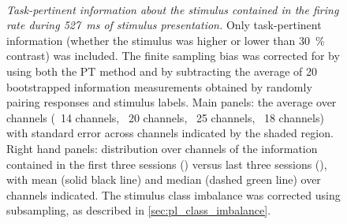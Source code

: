 \begin{figure}[htbp]%
    \centering
    \hspace*{\fill}
    \hspace*{\fill}\hspace{.2cm}\hspace*{\fill}
    \hspace*{\fill}
    \\
    \hspace*{\fill}
    \hspace*{\fill}\hspace{.2cm}\hspace*{\fill}
    \hspace*{\fill}
    \caption{\textit{Task-pertinent information about the stimulus contained in the firing rate during \SI{527}{\milli\second} of stimulus presentation.}
Only task-pertinent information (whether the stimulus was higher or lower than \SI{30}{\percent} contrast) was included.
The finite sampling bias was corrected for by using both the \ac{PT} method and by subtracting the average of \num{20} bootstrapped information measurements obtained by randomly pairing responses and stimulus labels.
Main panels: the average over channels (\protect{}~\num{14} channels, \protect{}~\num{20} channels, \protect{}~\num{25} channels, \protect{}~\num{18} channels) with standard error across channels indicated by the shaded region.
Right hand panels: distribution over channels of the information contained in the first three sessions () versus last three sessions (), with mean (solid black line) and median (dashed green line) over channels indicated.
The stimulus class imbalance was corrected using subsampling, as described in \autoref{sec:pl_class_imbalance}.
}
    \label{fig:info_sess_1x527_final}
\end{figure}

